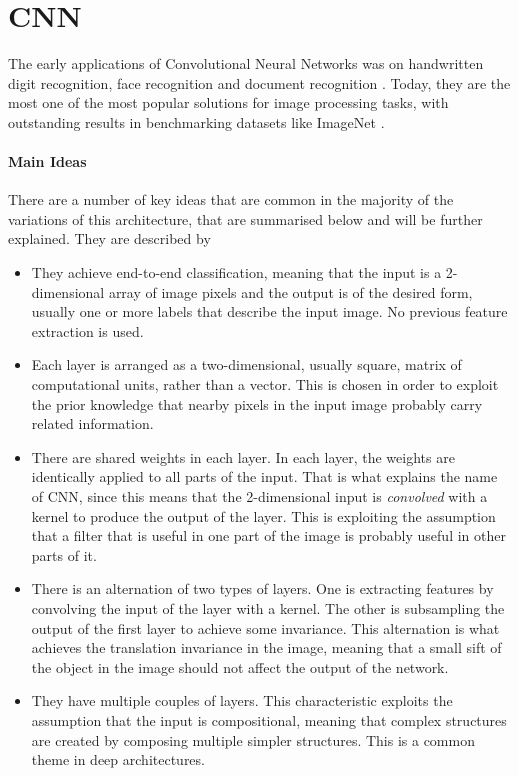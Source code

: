 	\section{CNN}
		The early applications of Convolutional Neural Networks was on handwritten digit recognition\cite{LeCun1989,LeCun1990,Lecun1995}, face recognition \cite{Lawrence1997} and document recognition \cite{LeCun1998}. Today, they are the most one of the most popular solutions for image processing tasks, with outstanding results in benchmarking datasets like ImageNet \cite{Krizhevsky2012}.		
		\paragraph{Main Ideas}			
		There are a number of key ideas that are common in the majority of the variations of this architecture, that are summarised below and will be further explained. They are described by 
		\begin{itemize}
			\item They achieve end-to-end classification, meaning that the input is a 2-dimensional array of image pixels and the output is of the desired form, usually one or more labels that describe the input image. No previous feature extraction is used.
			\item Each layer is arranged as a two-dimensional, usually square, matrix of computational units, rather than a vector. This is chosen in order to exploit the prior knowledge that nearby pixels in the input image probably carry related information.
			\item There are shared weights in each layer. In each layer, the weights are identically applied to all parts of the input. That is what explains the name of CNN, since this means that the 2-dimensional input is \textit{convolved} with a kernel to produce the output of the layer. This is exploiting the assumption that a filter that is useful in one part of the image is probably useful in other parts of it.
			\item There is an alternation of two types of layers. One is extracting features by convolving the input of the layer with a kernel. The other is subsampling the output of the first layer to achieve some invariance. This alternation is what achieves the translation invariance in the image, meaning that a small sift of the object in the image should not affect the output of the network.
			\item They have multiple couples of layers. This characteristic exploits the assumption that the input is compositional, meaning that complex structures are created by composing multiple simpler structures. This is a common theme in deep architectures. 
		\end{itemize}	 